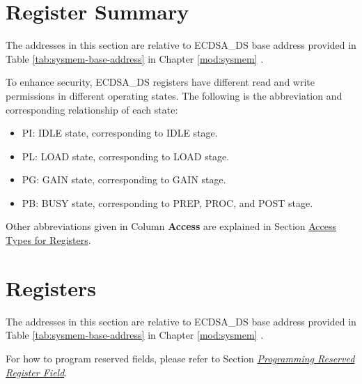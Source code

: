 \documentclass[main\_\_EN.tex]{subfiles}
\begin{document}


\newpage
\hypertarget{ecdsa-reg-summ}{}
\section{Register Summary}
\label{sec:ecdsa-reg-summ}


The addresses in this section are relative to ECDSA\_DS base address provided in Table \ref{tab:sysmem-base-address} in Chapter \ref{mod:sysmem} \textit{}.

To enhance security, ECDSA\_DS registers have different read and write permissions in different operating states. The following is the abbreviation and corresponding relationship of each state:

\begin{itemize}
    \item PI: IDLE state, corresponding to IDLE stage.
    \item PL: LOAD state, corresponding to LOAD stage.
    \item PG: GAIN state, corresponding to GAIN stage.
    \item PB: BUSY state, corresponding to PREP, PROC, and POST stage.
\end{itemize}

Other abbreviations given in Column \textbf{Access} are explained in Section \hyperref[glossary-access-types]{Access Types for Registers}.







\newpage
\section{Registers}

The addresses in this section are relative to ECDSA\_DS base address provided in Table \ref{tab:sysmem-base-address} in Chapter \ref{mod:sysmem} \textit{}.

For how to program reserved fields, please refer to Section \hyperref[programming-reserved-field]{\textit{Programming Reserved Register Field}}.


\end{document}
